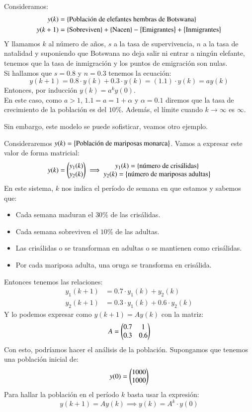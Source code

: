 \begin{eg}
    Consideramos:
    \begin{align*}
        y(k) &= \left\{\text{Población de elefantes hembras de Botswana}\right\}\\
        y(k+1) &= \left\{\text{Sobreviven}\right\} + \left\{\text{Nacen}\right\} - \left\{\text{Emigrantes}\right\} + \left\{\text{Inmigrantes}\right\}
    \end{align*}
    Y llamamos $k$ al número de años, $s$ a la tasa de supervivencia, $n$ a la tasa de natalidad y suponiendo que Botswana no deja salir ni entrar a ningún elefante, tenemos que la tasa de inmigración y los puntos de emigración son nulas.\\
    Si hallamos que $s = 0.8$ y $n = 0.3$ tenemos la ecuación:
    $$
        y(k+1) = 0.8\cdot y(k) + 0.3\cdot y(k) = (1.1)\cdot y(k) = ay(k)
    $$
    Entonces, por inducción $y(k) = a^k y(0)$.\\
    En este caso, como $a > 1$, $1.1 = a = 1 + \alpha$ y $\alpha = 0.1$ diremos que la tasa de crecimiento de la población es del $10\%$. Además, el límite cuando $k \to \infty$ es $\infty$.
\end{eg}

Sin embargo, este modelo se puede sofisticar, veamos otro ejemplo.
\begin{eg}
    Consideraremos $y(k) = \left\{\text{Población de mariposas monarca}\right\}$. Vamos a expresar este valor de forma matricial:
    $$
        y(k) = \px{y_1(k)\\y_2(k)} \implies
        \Mx{
            y_1(k)=\sdf{\text{número de crisálidas}} \\
            y_2(k)=\sdf{\text{número de mariposas adultas}}
        }
    $$
    En este sistema, $k$ nos indica el período de semana en que estamos y sabemos que:
    \begin{itemize}
        \item Cada semana maduran el $30\%$ de las crisálidas.
        \item Cada semana sobreviven el $10\%$ de las adultas.
        \item Las crisálidas o se transforman en adultas o se mantienen como crisálidas.
        \item Por cada mariposa adulta, una oruga se transforma en crisálida.
    \end{itemize}
    Entonces tenemos las relaciones:
    \begin{align*}
        y_1(k+1) &= 0.7 \cdot y_1(k) + y_2(k)\\
        y_2(k+1) &= 0.3 \cdot y_1(k) + 0.6 \cdot y_2(k)
    \end{align*}
    Y lo podemos expresar como $y(k+1) = A y(k)$ con la matriz:
    $$
        A = \px{0.7 & 1 \\ 0.3 & 0.6}
    $$
    Con esto, podríamos hacer el análisis de la población. Supongamos que tenemos una población inicial de:
    $$
        y(0) = \px{1000\\ 1000}
    $$
    Para hallar la población en el período $k$ basta usar la expresión:
    $$
        y(k+1) = A y(k) \implies y(k) = A^k \cdot y(0)
    $$
\end{eg}

